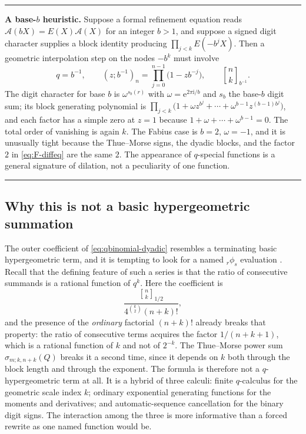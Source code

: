 \documentclass[11pt,oneside]{article}
\theoremstyle{definition}
\theoremstyle{remark}
\newcommand{\e}{\mathrm e}
\newcommand{\ii}{\mathrm i}
\newcommand{\qbinom}[3]{\genfrac{[}{]}{0pt}{}{#1}{#2}_{#3}}
\newenvironment{boxedremark}{%
  \par\smallskip\noindent\begin{center}\begin{minipage}{0.94\textwidth}%
  \color{black}\hrule\vspace{0.6em}\small
}{%
  \vspace{0.6em}\hrule\end{minipage}\end{center}\smallskip
}
\begin{document}
\begin{boxedremark}
\textbf{A base-$b$ heuristic.}  Suppose a formal refinement equation reads
$\mathscr A(bX)=E(X)\mathscr A(X)$ for an integer $b>1$, and suppose a signed digit character
supplies a block identity producing $\prod_{j<k}E(-b^jX)$.  Then a geometric interpolation
step on the nodes $-b^k$ must involve
\begin{equation*}
 q=b^{-1},\qquad (z;b^{-1})_n=\prod_{j=0}^{n-1}\bigl(1-zb^{-j}\bigr),
 \qquad \qbinom nk{b^{-1}}.
\end{equation*}
The digit character for base $b$ is $\omega^{s_b(r)}$ with $\omega=\e^{2\pi\ii/b}$ and $s_b$
the base-$b$ digit sum; its block generating polynomial is
$\prod_{j<k}\bigl(1+\omega z^{b^j}+\cdots+\omega^{b-1}z^{(b-1)b^j}\bigr)$, and each factor has
a simple zero at $z=1$ because $1+\omega+\cdots+\omega^{b-1}=0$.  The total order of vanishing
is again $k$.  The Fabius case is $b=2$, $\omega=-1$, and it is unusually tight because the
Thue--Morse signs, the dyadic blocks, and the factor $2$ in \eqref{eq:F-diffeq} are the same
$2$.  The appearance of $q$-special functions is a general signature of dilation, not a
peculiarity of one function.
\end{boxedremark}

\subsection{Why this is not a basic hypergeometric summation}
\label{subsec:qs-not-hypergeometric}

The outer coefficient of \eqref{eq:qbinomial-dyadic} resembles a terminating basic
hypergeometric term, and it is tempting to look for a named ${}_r\phi_s$ evaluation
\cite{gasper2004,dlmf17}.  Recall that the defining feature of such a series is that the ratio
of consecutive summands is a rational function of $q^k$.  Here the coefficient is
\begin{equation}
 \frac{\qbinom nk{1/2}}{4^{\binom k2}(n+k)!},              \label{eq:qs-outer-coefficient}
\end{equation}
and the presence of the \emph{ordinary} factorial $(n+k)!$ already breaks that property:
the ratio of consecutive terms acquires the factor $1/(n+k+1)$, which is a rational function
of $k$ and not of $2^{-k}$.  The Thue--Morse power sum $\sigma_{m;k,n+k}(Q)$ breaks it a
second time, since it depends on $k$ both through the block length and through the exponent.
The formula is therefore not a $q$-hypergeometric term at all.  It is a hybrid of three
calculi: finite $q$-calculus for the geometric scale index $k$; ordinary exponential
generating functions for the moments and derivatives; and automatic-sequence cancellation for
the binary digit signs.  The interaction among the three is more informative than a forced
rewrite as one named function would be.
\end{document}
